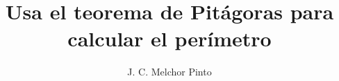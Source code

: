 \documentclass[12pt]{guia}
\title{Usa el teorema de Pitágoras para calcular el perímetro}
\author{J. C. Melchor Pinto}
\begin{document}
\pagestyle{headandfoot}
\addpoints
\INFO
\vspace{-0.5cm}
\begin{multicols}{2}
    
    
    
    \columnbreak
    
    
\end{multicols}
\begin{questions}
    \questionboxed[10]{}
    \questionboxed[10]{}
    \questionboxed[10]{}
    \questionboxed[10]{}
    \questionboxed[10]{}
    \questionboxed[10]{}
    \questionboxed[10]{}
    \questionboxed[10]{}
    \questionboxed[10]{}
    \questionboxed[10]{}
\end{questions}
\end{document}
